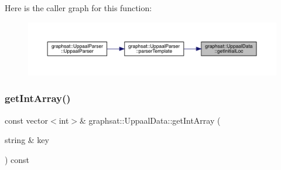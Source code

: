 Here is the caller graph for this function\+:\nopagebreak
\begin{figure}[H]
\begin{center}
\leavevmode
\includegraphics[width=350pt]{classgraphsat_1_1_uppaal_data_a261013813b76f6590e4c5e9b52fe8e12_icgraph}
\end{center}
\end{figure}
\mbox{\label{classgraphsat_1_1_uppaal_data_ae7ca546770b68997fac809beec05709f}} 
\subsubsection{\texorpdfstring{getIntArray()}{getIntArray()}}
{\footnotesize\ttfamily const vector$<$int$>$\& graphsat\+::\+Uppaal\+Data\+::get\+Int\+Array (\begin{DoxyParamCaption}\item[{string \&}]{key }\end{DoxyParamCaption}) const\hspace{0.3cm}{\ttfamily [inline]}}

